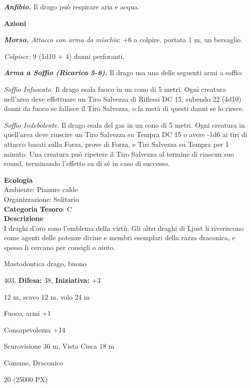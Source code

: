 \begin{multicols}{2}
{\emph{\textbf{Anfibio.}} Il drago può respirare aria e acqua.

\textbf{Azioni}

\emph{\textbf{Morso.} Attacco con arma da mischia}: +6 a colpire, portata 1 m, un bersaglio.

\emph{Colpisce:} 9 (1d10 + 4) danni perforanti.

\emph{\textbf{Arma a Soffio (Ricarica 5-6).}} Il drago usa una delle seguenti armi a soffio:

\emph{Soffio Infuocato.} Il drago esala fuoco in un cono di 5 metri. Ogni creatura nell'area deve effettuare un Tiro Salvezza di Riflessi DC 15, subendo 22 (4d10) danni da fuoco se fallisce il Tiro Salvezza, o la metà di questi danni se lo riesce.

\emph{Soffio Indebolente.} Il drago esala del gas in un cono di 5 metri. Ogni creatura in quell'area deve riuscire un Tiro Salvezza su Tempra DC 15 o avere -1d6 ai tiri di attacco basati sulla Forza, prove di Forza, e Tiri Salvezza su Tempra per 1 minuto. Una creatura può ripetere il Tiro Salvezza al termine di ciascun suo round, terminando l'effetto su di sé in caso di successo.

\textbf{Ecologia}\\
Ambiente: Pianure calde\\
Organizzazione: Solitario\\
\textbf{Categoria Tesoro}: C\\
\textbf{Descrizione}\\
I draghi d'oro sono l'emblema della virtù. Gli altri draghi di Ljust li riveriscono come agenti delle potenze divine e membri esemplari della razza draconica, e spesso li cercano per consigli o aiuto.

\begin{description}[noitemsep, topsep=0pt, parsep=0pt, partopsep=0pt, leftmargin=0cm, labelwidth=2.2cm]
	\item[\textbf{Taglia/Tipo:}] Mastodontica drago, buono
	\item[\textbf{Caratt.:}] 
	\item[\textbf{Punti Ferita:}] 403,  \textbf{Difesa:} 38,  \textbf{Iniziativa:} +3
	\item[\textbf{Movimento:}] 12 m, scavo 12 m, volo 24 m
	\item[\textbf{Tiri Salvez.:}] 
	\item[\textbf{Imm. Danni:}] Fuoco, armi +1
	\item[\textbf{Comp.:}] Consapevolezza +14
	\item[\textbf{Sensi:}] Scurovisione 36 m, Vista Cieca 18 m
	\item[\textbf{Linguaggi:}] Comune, Draconico
	\item[\textbf{Sfida:}] 20 (25000 PX)\smallskip
\end{description}

}
\end{multicols}
